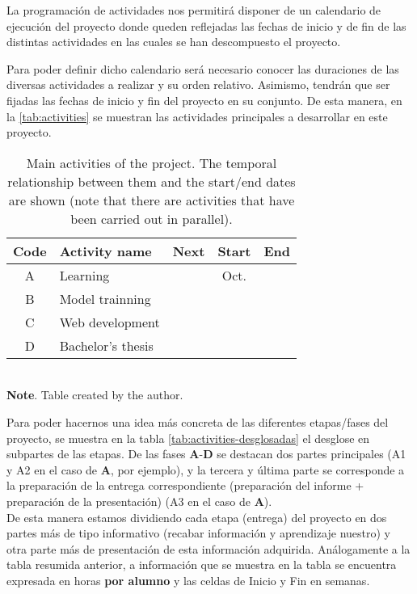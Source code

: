 La programación de actividades nos permitirá disponer de un calendario de
ejecución del proyecto donde queden reflejadas las fechas de inicio y de fin
de las distintas actividades en las cuales se han descompuesto el proyecto.

Para poder definir dicho calendario será necesario conocer las duraciones de
las diversas actividades a realizar y su orden relativo. Asimismo, tendrán que
ser fijadas las fechas de inicio y fin del proyecto en su conjunto. De esta
manera, en la \vref{tab:activities} se muestran las actividades principales a
desarrollar en este proyecto.

\begin{table}[ht]
  \centering
  \caption[Main activities of the project]{Main activities of the project. The
    temporal relationship between them and the start/end dates are shown (note
    that there are activities that have been carried out in
    parallel).}\label{tab:activities}
  \begin{tabular}{cl*3c}
    \toprule
    \textbf{Code} & \textbf{Activity name} & \textbf{Next} & \textbf{Start} & \textbf{End} \\
    \midrule
    A & Learning                       &   & Oct. &    \\
    B & Model trainning                &   &      &    \\
    C & Web development                &   &      &    \\
    D & Bachelor's thesis                &   &      &    \\
    \bottomrule
  \end{tabular} \\[1.25ex]
  {\small\textbf{Note}. Table created by the author.}
\end{table}

Para poder hacernos una idea más concreta de las diferentes etapas/fases del
proyecto, se muestra en la tabla \ref{tab:activities-desglosadas} el desglose
en subpartes de las etapas. De las fases \textbf{A}-\textbf{D} se destacan dos
partes principales (A1 y A2 en el caso de \textbf{A}, por ejemplo), y la tercera
y última parte se corresponde a la preparación de la entrega correspondiente
(preparación del informe + preparación de la presentación) (A3 en el caso de
\textbf{A}). \\

De esta manera estamos dividiendo cada etapa (entrega) del proyecto en dos
partes más de tipo informativo (recabar información y aprendizaje nuestro) y
otra parte más de presentación de esta información adquirida. Análogamente a la
tabla resumida anterior, a información que se muestra en la tabla se encuentra
expresada en horas \textbf{por alumno} y las celdas de Inicio y Fin en semanas. \\


